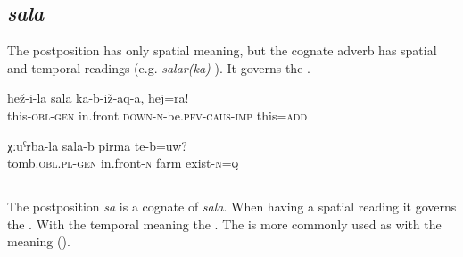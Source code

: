 \subsection{\textit{sala} }
\label{ssec:postposition sala}
The postposition  has only spatial meaning, but the cognate adverb has spatial and temporal readings (e.g. \textit{salar(ka)} ). It governs the .

\begin{exe}
	\ex
	\begin{xlist}
		\ex	\label{Put this before of this, and this also}
		\gll	hež-i-la	sala	ka-b-iž-aq-a,	hej=ra!\\
			this-\textsc{obl}-\textsc{gen}	in.front	\textsc{down-n}-be.\textsc{pfv}-\textsc{caus}-\textsc{imp}	this=\textsc{add}\\
		\glt	{}

		\ex	\label{Is there a farm in front of the graveyard}
		\gll	χːuˁrba-la	sala-b	pirma	te-b=uw?\\
			tomb.\textsc{obl.pl-gen}	in.front-\textsc{n}	farm	exist-\textsc{n}=\textsc{q}\\
		\glt	{}
	\end{xlist}
\end{exe}



\subsection{ }
\label{ssec:postposition sa}

The postposition \textit{sa} is a cognate of \textit{sala}. When having a spatial reading it governs the  . With the temporal meaning  the  . The   is more commonly used as  with the meaning  ().

